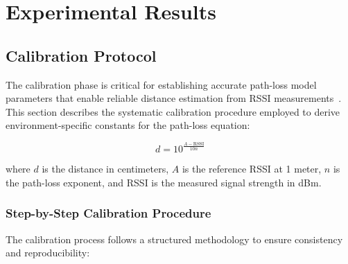 ﻿\chapter{Experimental Results}
\label{Experimental_results}

\section{Calibration Protocol}
\label{sec:calibration_protocol}

The calibration phase is critical for establishing accurate path-loss model parameters that enable reliable distance estimation from RSSI measurements~\cite{rappaport1996wireless, seidel1992path}. This section describes the systematic calibration procedure employed to derive environment-specific constants for the path-loss equation:

\begin{equation}
d = 10^{\frac{A - \text{RSSI}}{10n}}
\label{eq:pathloss}
\end{equation}

where $d$ is the distance in centimeters, $A$ is the reference RSSI at 1 meter, $n$ is the path-loss exponent, and RSSI is the measured signal strength in dBm.

\subsection{Step-by-Step Calibration Procedure}

The calibration process follows a structured methodology to ensure consistency and reproducibility:

